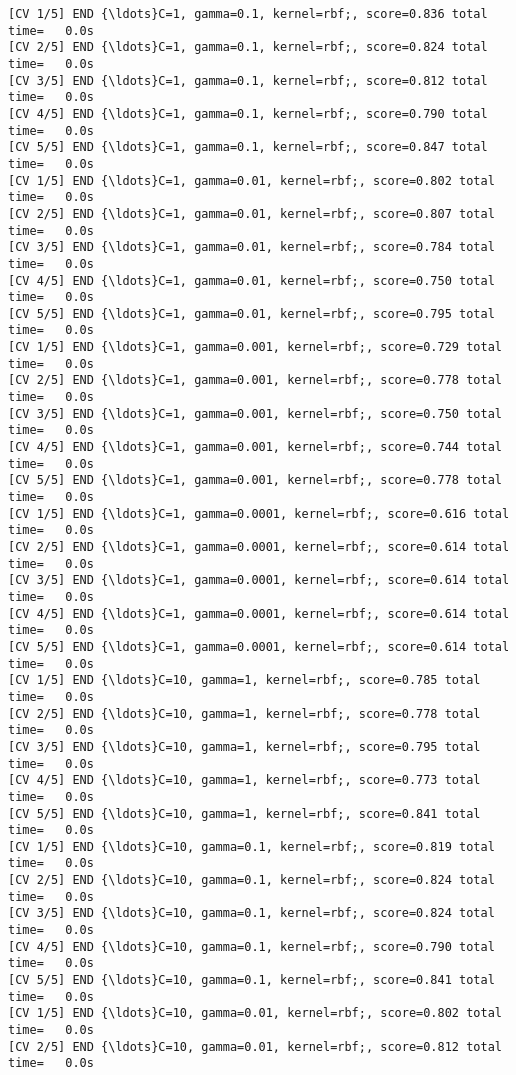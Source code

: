 \documentclass[11pt]{article}
\begin{document}
\begin{Verbatim}[commandchars=\\\{\}]
[CV 1/5] END {\ldots}C=1, gamma=0.1, kernel=rbf;, score=0.836 total time=   0.0s
[CV 2/5] END {\ldots}C=1, gamma=0.1, kernel=rbf;, score=0.824 total time=   0.0s
[CV 3/5] END {\ldots}C=1, gamma=0.1, kernel=rbf;, score=0.812 total time=   0.0s
[CV 4/5] END {\ldots}C=1, gamma=0.1, kernel=rbf;, score=0.790 total time=   0.0s
[CV 5/5] END {\ldots}C=1, gamma=0.1, kernel=rbf;, score=0.847 total time=   0.0s
[CV 1/5] END {\ldots}C=1, gamma=0.01, kernel=rbf;, score=0.802 total time=   0.0s
[CV 2/5] END {\ldots}C=1, gamma=0.01, kernel=rbf;, score=0.807 total time=   0.0s
[CV 3/5] END {\ldots}C=1, gamma=0.01, kernel=rbf;, score=0.784 total time=   0.0s
[CV 4/5] END {\ldots}C=1, gamma=0.01, kernel=rbf;, score=0.750 total time=   0.0s
[CV 5/5] END {\ldots}C=1, gamma=0.01, kernel=rbf;, score=0.795 total time=   0.0s
[CV 1/5] END {\ldots}C=1, gamma=0.001, kernel=rbf;, score=0.729 total time=   0.0s
[CV 2/5] END {\ldots}C=1, gamma=0.001, kernel=rbf;, score=0.778 total time=   0.0s
[CV 3/5] END {\ldots}C=1, gamma=0.001, kernel=rbf;, score=0.750 total time=   0.0s
[CV 4/5] END {\ldots}C=1, gamma=0.001, kernel=rbf;, score=0.744 total time=   0.0s
[CV 5/5] END {\ldots}C=1, gamma=0.001, kernel=rbf;, score=0.778 total time=   0.0s
[CV 1/5] END {\ldots}C=1, gamma=0.0001, kernel=rbf;, score=0.616 total time=   0.0s
[CV 2/5] END {\ldots}C=1, gamma=0.0001, kernel=rbf;, score=0.614 total time=   0.0s
[CV 3/5] END {\ldots}C=1, gamma=0.0001, kernel=rbf;, score=0.614 total time=   0.0s
[CV 4/5] END {\ldots}C=1, gamma=0.0001, kernel=rbf;, score=0.614 total time=   0.0s
[CV 5/5] END {\ldots}C=1, gamma=0.0001, kernel=rbf;, score=0.614 total time=   0.0s
[CV 1/5] END {\ldots}C=10, gamma=1, kernel=rbf;, score=0.785 total time=   0.0s
[CV 2/5] END {\ldots}C=10, gamma=1, kernel=rbf;, score=0.778 total time=   0.0s
[CV 3/5] END {\ldots}C=10, gamma=1, kernel=rbf;, score=0.795 total time=   0.0s
[CV 4/5] END {\ldots}C=10, gamma=1, kernel=rbf;, score=0.773 total time=   0.0s
[CV 5/5] END {\ldots}C=10, gamma=1, kernel=rbf;, score=0.841 total time=   0.0s
[CV 1/5] END {\ldots}C=10, gamma=0.1, kernel=rbf;, score=0.819 total time=   0.0s
[CV 2/5] END {\ldots}C=10, gamma=0.1, kernel=rbf;, score=0.824 total time=   0.0s
[CV 3/5] END {\ldots}C=10, gamma=0.1, kernel=rbf;, score=0.824 total time=   0.0s
[CV 4/5] END {\ldots}C=10, gamma=0.1, kernel=rbf;, score=0.790 total time=   0.0s
[CV 5/5] END {\ldots}C=10, gamma=0.1, kernel=rbf;, score=0.841 total time=   0.0s
[CV 1/5] END {\ldots}C=10, gamma=0.01, kernel=rbf;, score=0.802 total time=   0.0s
[CV 2/5] END {\ldots}C=10, gamma=0.01, kernel=rbf;, score=0.812 total time=   0.0s

\end{Verbatim}
\end{document}
